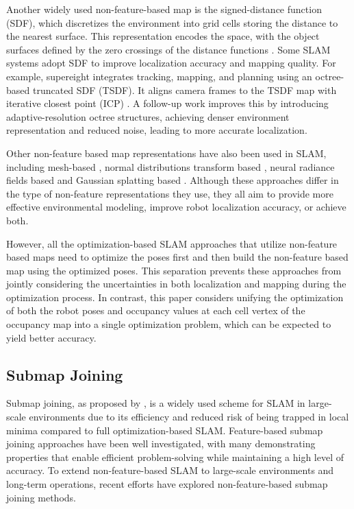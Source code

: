 Another widely used non-feature-based map is the signed-distance function (SDF), which discretizes the environment into grid cells storing the distance to the nearest surface. This representation encodes the space, with the object surfaces defined by the zero crossings of the distance functions \cite{curless1996volumetric}. Some SLAM systems adopt SDF to improve localization accuracy and mapping quality. For example, supereight \cite{vespa2018efficient} integrates tracking, mapping, and planning using an octree-based truncated SDF (TSDF). It aligns camera frames to the TSDF map with iterative closest point (ICP) \cite{besl1992method}. A follow-up work \cite{vespa2019adaptive} improves this by introducing adaptive-resolution octree structures, achieving denser environment representation and reduced noise, leading to more accurate localization.

Other non-feature based map representations have also been used in SLAM, including mesh-based \cite{rosinol2021kimera}, normal distributions transform based \cite{einhorn2015generic}, neural radiance fields based \cite{rosinol2023nerf} and Gaussian splatting based \cite{matsuki2024gaussian}. Although these approaches differ in the type of non-feature representations they use, they all aim to provide more effective environmental modeling, improve robot localization accuracy, or achieve both. 


However, all the optimization-based SLAM approaches that utilize non-feature based maps need to optimize the poses first and then build the non-feature based map using the optimized poses. This separation prevents these approaches from jointly considering the uncertainties in both localization and mapping during the optimization process. In contrast, this paper considers unifying the optimization of both the robot poses and occupancy values at each cell vertex of the occupancy map into a single optimization problem, which can be expected to yield better accuracy.

\subsection{Submap Joining}\label{Sec_related_b}

Submap joining, as proposed by \cite{bosse2003atlas}, is a widely used scheme for SLAM in large-scale environments due to its efficiency and reduced risk of being trapped in local minima compared to full optimization-based SLAM. Feature-based submap joining approaches \cite{huang2008sparse,zhao2013linear,wang2019submap} have been well investigated, with many demonstrating properties that enable efficient problem-solving while maintaining a high level of accuracy. To extend non-feature-based SLAM to large-scale environments and long-term operations, recent efforts have explored non-feature-based submap joining methods.


